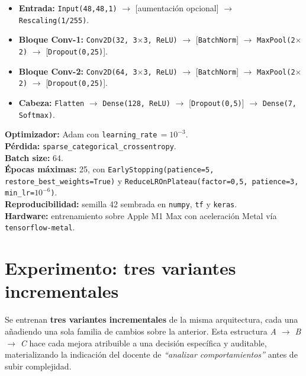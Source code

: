 \documentclass[10pt,a4paper,twocolumn]{article}
\begin{document}
\begin{itemize}
    \item \textbf{Entrada:} \texttt{Input(48,48,1)} $\rightarrow$ [aumentación opcional] $\rightarrow$ \texttt{Rescaling(1/255)}.
    \item \textbf{Bloque Conv-1:} \texttt{Conv2D(32, 3$\times$3, ReLU)} $\rightarrow$ [\texttt{BatchNorm}] $\rightarrow$ \texttt{MaxPool(2$\times$2)} $\rightarrow$ [\texttt{Dropout(0,25)}].
    \item \textbf{Bloque Conv-2:} \texttt{Conv2D(64, 3$\times$3, ReLU)} $\rightarrow$ [\texttt{BatchNorm}] $\rightarrow$ \texttt{MaxPool(2$\times$2)} $\rightarrow$ [\texttt{Dropout(0,25)}].
    \item \textbf{Cabeza:} \texttt{Flatten} $\rightarrow$ \texttt{Dense(128, ReLU)} $\rightarrow$ [\texttt{Dropout(0,5)}] $\rightarrow$ \texttt{Dense(7, Softmax)}.
\end{itemize}

\textbf{Optimizador:} Adam con \texttt{learning\_rate}\,$=10^{-3}$.\\
\textbf{Pérdida:} \texttt{sparse\_categorical\_crossentropy}.\\
\textbf{Batch size:} 64.\\
\textbf{Épocas máximas:} 25, con \texttt{EarlyStopping(patience=5, restore\_best\_weights=True)} y \texttt{ReduceLROnPlateau(factor=0,5, patience=3, min\_lr=$10^{-6}$)}.\\
\textbf{Reproducibilidad:} semilla 42 sembrada en \texttt{numpy}, \texttt{tf} y \texttt{keras}.\\
\textbf{Hardware:} entrenamiento sobre Apple M1 Max con aceleración Metal vía \texttt{tensorflow-metal}.

\section{Experimento: tres variantes incrementales}

Se entrenan \textbf{tres variantes incrementales} de la misma arquitectura, cada una añadiendo una sola familia de cambios sobre la anterior. Esta estructura \textit{A $\rightarrow$ B $\rightarrow$ C} hace cada mejora atribuible a una decisión específica y auditable, materializando la indicación del docente de \textit{``analizar comportamientos''} antes de subir complejidad.
\end{document}

